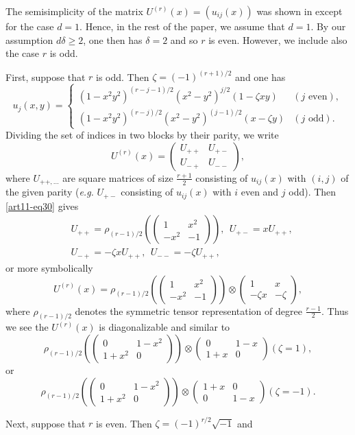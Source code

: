 The semisimplicity of the matrix $U^{(r)}(x)=(u_{ij}(x))$ was shown in \cite{art11-keySF} except for the case $d=1$. Hence, in the rest of the paper, we assume that $d=1$. By our assumption $d\delta\geq 2$, one then has $\delta=2$ and so $r$ is even. However, we include also the case $r$ is odd.

First, suppose that $r$ is odd. Then $\zeta=(-1)^{(r+1)/2}$ and one has
\begin{equation}
u_{j}(x,y)=
\begin{cases}
(1-x^{2}y^{2})^{(r-j-1)/2}(x^{2}-y^{2})^{j/2}(1-\zeta xy) & (j\text{~even}),\\
(1-x^{2}y^{2})^{(r-j)/2}(x^{2}-y^{2})^{(j-1)/2}(x-\zeta y) & (j\text{~odd}).
\end{cases}\label{art11-eq30}
\end{equation}
Dividing the set of indices in two blocks by their parity, we write
$$
U^{(r)}(x)=
\left(
\begin{matrix}
U_{++} & U_{+-}\\
U_{-+} & U_{--}
\end{matrix}
\right),
$$
where $U_{++,\ldots}$ are square matrices of size $\frac{r+1}{2}$ consisting of $u_{ij}(x)$ with $(i,j)$ of the given parity ({\em e.g.} $U_{+-}$ consisting of $u_{ij}(x)$ with $i$ even and $j$ odd). Then \eqref{art11-eq30} gives
\begin{align*}
&U_{++}=\rho_{(r-1)/2}\left(\left(
\begin{matrix}
1 & x^{2}\\
-x^{2} & -1
\end{matrix}
\right)\right), \ \ U_{+-}=xU_{++},\\
&U_{-+}=-\zeta xU_{++}, \ \ U_{--}=-\zeta U_{++},
\end{align*}
or more symbolically
\begin{equation}
U^{(r)}(x)=\rho_{(r-1)/2}\left(\left(
\begin{matrix}
1 & x^{2}\\
-x^{2} & -1
\end{matrix}
\right)\right)
\otimes 
\left(
\begin{matrix}
1 & x\\
-\zeta x & -\zeta
\end{matrix}
\right),\label{art11-eq31}
\end{equation}
where $\rho_{(r-1)/2}$ denotes the symmetric tensor representation of degree $\frac{r-1}{2}$. Thus we see the $U^{(r)}(x)$ is diagonalizable and similar to
$$
\rho_{(r-1)/2}\left(\left(
\begin{matrix}
0 & 1-x^{2}\\
1+x^{2} & 0
\end{matrix}
\right)\right)\otimes
\left(
\begin{matrix}
0 & 1-x\\
1+x & 0
\end{matrix}
\right)(\zeta=1),
$$
or
$$
\rho_{(r-1)/2}\left(\left(
\begin{matrix}
0 & 1-x^{2}\\
1+x^{2} & 0
\end{matrix}
\right)\right)\otimes
\left(
\begin{matrix}
1+x & 0\\
0 & 1-x
\end{matrix}
\right)(\zeta=-1).
$$

Next, suppose that $r$ is even. Then $\zeta=(-1)^{r/2}\sqrt{-1}$ and 

